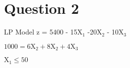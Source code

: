 \section*{Question 2}
LP Model
z = 5400 - 15X$_1$ -20X$_2$ - 10X$_3$

$1000 = 6\text{X}_2 + 8\text{X}_2 + 4\text{X}_3$

$\text{X}_1 \leq 50$